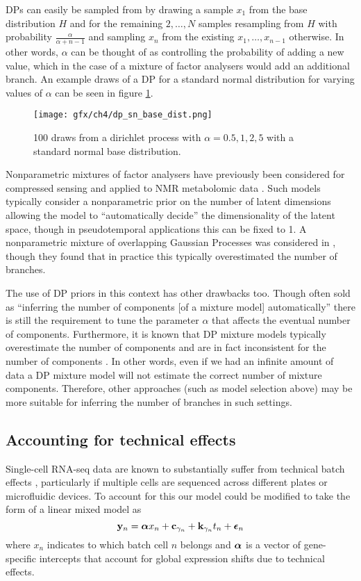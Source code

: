 DPs can easily be sampled from by drawing a sample $x_1$ from the base distribution $H$ and for the remaining $2, \ldots, N$ samples resampling from $H$ with probability $\frac{\alpha}{\alpha + n - 1}$ and sampling $x_n$ from the existing $x_1, \ldots, x_{n-1}$ otherwise. In other words, $\alpha$ can be thought of as controlling the probability of adding a new value, which in the case of a mixture of factor analysers would add an additional branch. An example draws of a DP for a standard normal distribution for varying values of $\alpha$ can be seen in figure \ref{fig:dp}.

\begin{figure}
	\centering
	\texttt{[image: gfx/ch4/dp\_sn\_base\_dist.png]}
	\caption[Example draws from a dirichlet process.]{100 draws from a dirichlet process with $\alpha = 0.5, 1, 2, 5$ with a standard normal base distribution.} \label{fig:dp}
\end{figure}

Nonparametric mixtures of factor analysers have previously been considered for compressed sensing \cite{chen2010compressive} and applied to NMR metabolomic data \cite{murphy2017infinite}. Such models typically consider a nonparametric prior on the number of latent dimensions allowing the model to ``automatically decide'' the dimensionality of the latent space, though in pseudotemporal applications this can be fixed to 1. A nonparametric mixture of overlapping Gaussian Processes was considered in \cite{lonnberg2016temporal}, though they found that in practice this typically overestimated the number of branches.

The use of DP priors in this context has other drawbacks too. Though often sold as ``inferring the number of components [of a mixture model] automatically'' there is still the requirement to tune the parameter $\alpha$ that affects the eventual number of components. Furthermore, it is known that DP mixture models typically overestimate the number of components and are in fact inconsistent for the number of components \cite{miller2013simple}. In other words, even if we had an infinite amount of data a DP mixture model will not estimate the correct number of mixture components. Therefore, other approaches (such as model selection above) may be more suitable for inferring the number of branches in such settings.

\subsection{Accounting for technical effects}

Single-cell RNA-seq data are known to substantially suffer from technical batch effects \cite{tung2017batch,hicks2017missing}, particularly if multiple cells are sequenced across different plates or microfluidic devices. To account for this our model could be modified to take the form of a linear mixed model as
\begin{equation}
	\mathbf{y}_n = \bm{\alpha} x_n + \mathbf{c}_{\gamma_n} + \mathbf{k}_{\gamma_n} t_n + \bm{\epsilon}_n
\end{equation}
where $x_n$ indicates to which batch cell $n$ belongs and $\bm{\alpha}$ is a vector of gene-specific intercepts that account for global expression shifts due to technical effects.

